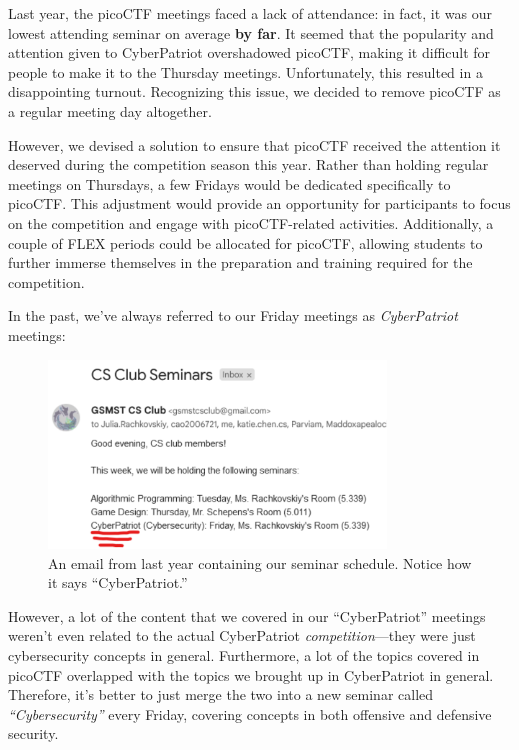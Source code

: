 \documentclass[
  letterpaper,
  DIV=11,
  numbers=noendperiod]{scrartcl}
\begin{document}
Last year, the picoCTF meetings faced a lack of attendance: in fact, it
was our lowest attending seminar on average \textbf{by far}. It seemed
that the popularity and attention given to CyberPatriot overshadowed
picoCTF, making it difficult for people to make it to the Thursday
meetings. Unfortunately, this resulted in a disappointing turnout.
Recognizing this issue, we decided to remove picoCTF as a regular
meeting day altogether.

However, we devised a solution to ensure that picoCTF received the
attention it deserved during the competition season this year. Rather
than holding regular meetings on Thursdays, a few Fridays would be
dedicated specifically to picoCTF. This adjustment would provide an
opportunity for participants to focus on the competition and engage with
picoCTF-related activities. Additionally, a couple of FLEX periods could
be allocated for picoCTF, allowing students to further immerse
themselves in the preparation and training required for the competition.

In the past, we've always referred to our Friday meetings as
\emph{CyberPatriot} meetings:

\begin{figure}

{\centering \includegraphics[width=0.8\textwidth,height=\textheight]{email.png}

}

\caption{An email from last year containing our seminar schedule. Notice
how it says ``CyberPatriot.''}

\end{figure}

However, a lot of the content that we covered in our ``CyberPatriot''
meetings weren't even related to the actual CyberPatriot
\emph{competition}---they were just cybersecurity concepts in general.
Furthermore, a lot of the topics covered in picoCTF overlapped with the
topics we brought up in CyberPatriot in general. Therefore, it's better
to just merge the two into a new seminar called \emph{``Cybersecurity''}
every Friday, covering concepts in both offensive and defensive
security.
\end{document}
